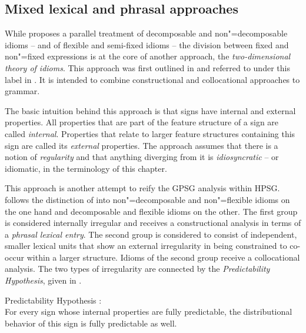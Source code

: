 \documentclass[output=paper
	        ,collection
	        ,collectionchapter
 	        ,biblatex
                ,babelshorthands
                ,newtxmath
                ,draftmode
                ,colorlinks, citecolor=brown
]{langscibook}
\begin{document}
\subsection{Mixed lexical and phrasal approaches}
\label{Sec-Mixed}

While \citet{Riehemann2001a} proposes a parallel treatment of decomposable and non"=decomposable idioms -- and of flexible and semi-fixed idioms -- the division between fixed and non"=fixed expressions is at the core of another approach, the \emph{two-dimensional theory of idioms}. This approach was first outlined in \citet{Sailer2000a} and referred to under this label in \citet{Richter:Sailer:09,Richter:Sailer:14}. It is intended to combine constructional and collocational approaches to grammar.

The basic intuition behind this approach is that signs have internal and external properties. 
All properties that are part of the feature structure of a sign are called \emph{internal}. 
Properties that relate to larger feature structures containing this sign are called its \emph{external} properties. 
The approach assumes that there is a notion of \emph{regularity} and that anything diverging from it is \emph{idiosyncratic} -- or idiomatic, in the terminology of this chapter. 

This approach is another attempt to reify the GPSG analysis within HPSG.
\citet{Sailer2000a} follows the distinction of \citet{NSW94a} into non"=decomposable and non"=flexible idioms on the one hand and decomposable and flexible idioms on the other. The first group is considered internally irregular and receives a constructional analysis in terms of a \emph{phrasal lexical entry}. The second group is considered to consist of independent, smaller lexical units that show an external irregularity in being constrained to co-occur within a larger structure. 
Idioms of the second group receive a collocational analysis. The two types of irregularity are connected by the  \emph{Predictability Hypothesis}, given in .

\ea Predictability Hypothesis \citep[]{Sailer2000a}:\label{PredHypo}\\
For every sign whose internal properties are fully predictable, the distributional
behavior of this sign is fully predictable as well.
\z 
\end{document}
